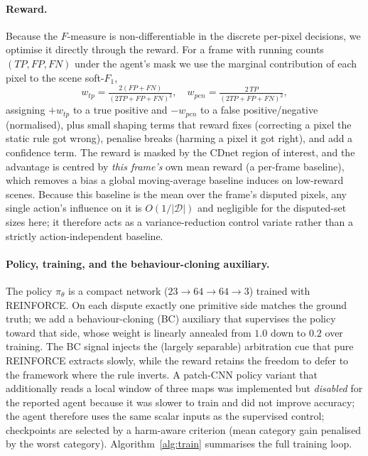 \documentclass[sn-basic]{sn-jnl}
\newcommand{\Fm}{$F$-measure}
\begin{document}
\paragraph{Reward.}
Because the \Fm{} is non-differentiable in the discrete per-pixel decisions, we
optimise it directly through the reward. For a frame with running counts
$(TP,FP,FN)$ under the agent's mask we use the marginal contribution of each pixel
to the scene soft-$F_1$,
\begin{equation}
w_{tp}=\tfrac{2(FP+FN)}{(2TP+FP+FN)^2},\quad
w_{pen}=\tfrac{2\,TP}{(2TP+FP+FN)^2},
\end{equation}
assigning $+w_{tp}$ to a true positive and $-w_{pen}$ to a false positive/negative
(normalised), plus small shaping terms that reward fixes (correcting a pixel the
static rule got wrong), penalise breaks (harming a pixel it got right), and add a
confidence term. The reward is masked by the CDnet region of interest, and the
advantage is centred by \emph{this frame's} own mean reward (a per-frame baseline),
which removes a bias a global moving-average baseline induces on low-reward scenes.
Because this baseline is the mean over the frame's disputed pixels, any single action's
influence on it is $O(1/|\mathcal{D}|)$ and negligible for the disputed-set sizes here;
it therefore acts as a variance-reduction control variate rather than a strictly
action-independent baseline.

\paragraph{Policy, training, and the behaviour-cloning auxiliary.}
The policy $\pi_\theta$ is a compact network ($23\!\rightarrow\!64\!\rightarrow\!64
\!\rightarrow\!3$) trained with REINFORCE. On each dispute exactly one primitive
side matches the ground truth; we add a behaviour-cloning (BC) auxiliary that
supervises the policy toward that side, whose weight is linearly annealed
from $1.0$ down to $0.2$ over training. The BC signal injects the (largely separable) arbitration cue
that pure REINFORCE extracts slowly, while the reward retains the freedom to defer
to the framework where the rule inverts. A patch-CNN policy variant that additionally
reads a local window of three maps was implemented but \emph{disabled} for the
reported agent because it was slower to train and did not improve accuracy; the agent
therefore uses the same scalar inputs as the supervised control;
checkpoints are selected by a harm-aware criterion (mean category gain penalised by
the worst category). Algorithm~\ref{alg:train} summarises the full training loop.
\end{document}
